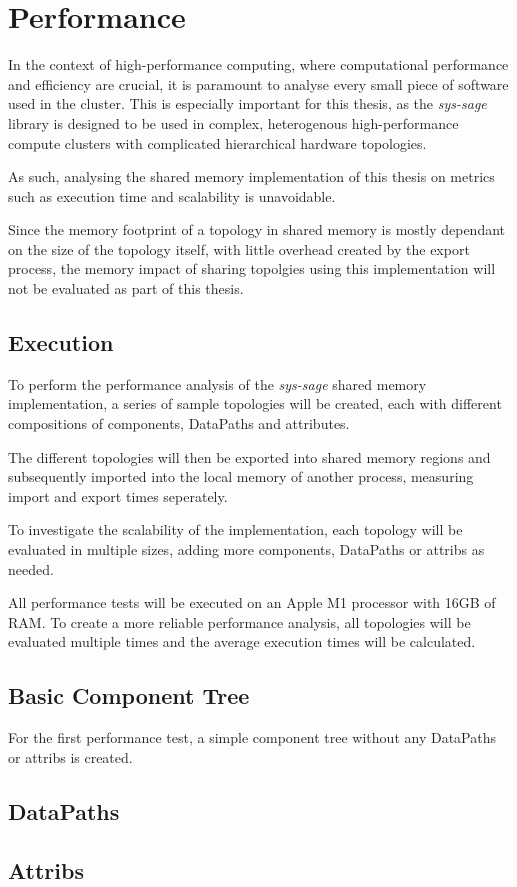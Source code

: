 \chapter{Performance}\label{chapter:Performance}
In the context of high-performance computing, where computational performance and efficiency are crucial, it is paramount to analyse every small piece of software used in the cluster.
This is especially important for this thesis, as the \emph{sys-sage} library is designed to be used in complex, heterogenous high-performance compute clusters with complicated hierarchical hardware topologies.

As such, analysing the shared memory implementation of this thesis on metrics such as execution time and scalability is unavoidable.

Since the memory footprint of a topology in shared memory is mostly dependant on the size of the topology itself, with little overhead created by the export process,
the memory impact of sharing topolgies using this implementation will not be evaluated as part of this thesis.

\section{Execution}
To perform the performance analysis of the \emph{sys-sage} shared memory implementation, a series of sample topologies will be created, each with different compositions of components, DataPaths and attributes.

The different topologies will then be exported into shared memory regions and subsequently imported into the local memory of another process,
measuring import and export times seperately.

To investigate the scalability of the implementation, each topology will be evaluated in multiple sizes, adding more components, DataPaths or attribs as needed.

All performance tests will be executed on an Apple M1 processor with 16GB of RAM.
To create a more reliable performance analysis, all topologies will be evaluated multiple times and the average execution times will be calculated.

\section{Basic Component Tree}
For the first performance test, a simple component tree without any DataPaths or attribs is created.

\section{DataPaths}
\section{Attribs}